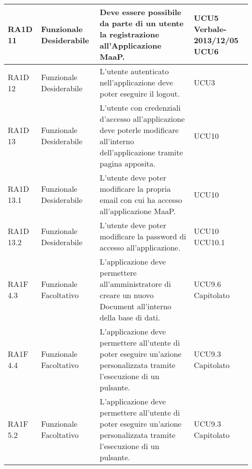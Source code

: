 \begin{center}
\begin{longtable}{ | l | p{2cm} | p{5cm} | p{1.7cm} |}
        RA1D 11 & Funzionale \newline  Desiderabile  & Deve essere possibile da parte di un utente la registrazione all'Applicazione MaaP. &  UCU5 \newline  Verbale-2013/12/05 \newline  UCU6 \newline  \\ \hline      
        RA1D 12 & Funzionale \newline  Desiderabile  & L'utente autenticato nell'applicazione deve poter eseguire il logout.  &  UCU3 \newline  \\ \hline      
        RA1D 13 & Funzionale \newline  Desiderabile  & L'utente con credenziali d'accesso all'applicazione deve poterle modificare all'interno dell'applicazione tramite pagina apposita. &  UCU10 \newline  \\ \hline      
        RA1D 13.1 & Funzionale \newline  Desiderabile  & L'utente deve poter modificare la propria email con cui ha accesso all'applicazione MaaP. &  UCU10 \newline  \\ \hline      
        RA1D 13.2 & Funzionale \newline  Desiderabile  & L'utente deve poter modificare la password di accesso all'applicazione. &  UCU10 \newline  UCU10.1 \newline  \\ \hline      
        RA1F 4.3 & Funzionale \newline  Facoltativo  & L'applicazione deve permettere all'amministratore di creare un nuovo Document all'interno della base di dati. &  UCU9.6 \newline  Capitolato \newline  \\ \hline      
        RA1F 4.4 & Funzionale \newline  Facoltativo  & L'applicazione deve permettere all'utente di poter eseguire un'azione personalizzata tramite l'esecuzione di un pulsante. &  UCU9.3 \newline  Capitolato \newline  \\ \hline      
        RA1F 5.2 & Funzionale \newline  Facoltativo  & L'applicazione deve permettere all'utente di poter eseguire un'azione personalizzata tramite l'esecuzione di un pulsante. &  UCU9.3 \newline  Capitolato \newline  \\ \hline      

\end{longtable}
\end{center}
